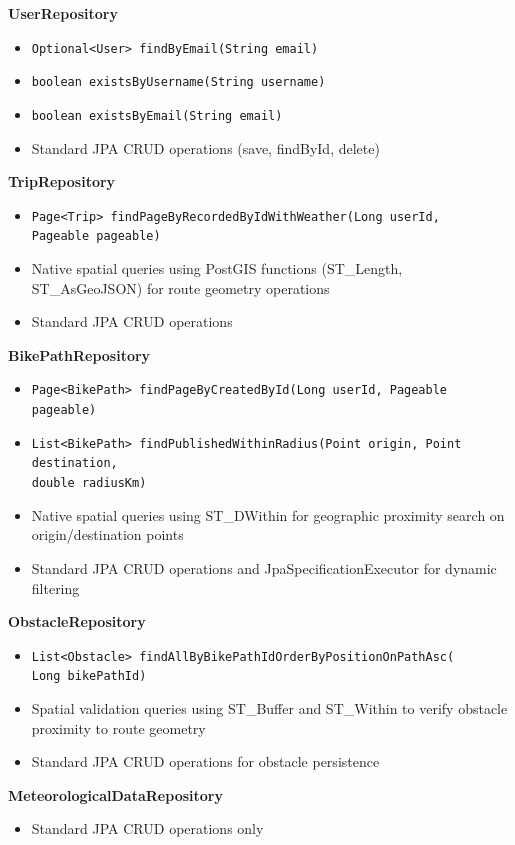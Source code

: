 \textbf{UserRepository}
\begin{itemize}
    \item \texttt{Optional<User> findByEmail(String email)}
    \item \texttt{boolean existsByUsername(String username)}
    \item \texttt{boolean existsByEmail(String email)}
    \item Standard JPA CRUD operations (save, findById, delete)
\end{itemize}

\textbf{TripRepository}
\begin{itemize}
    \item \texttt{Page<Trip> findPageByRecordedByIdWithWeather(Long userId, \\ Pageable pageable)}
    \item Native spatial queries using PostGIS functions (ST\_Length, ST\_AsGeoJSON) for route geometry operations
    \item Standard JPA CRUD operations
\end{itemize}

\textbf{BikePathRepository}
\begin{itemize}
    \item \texttt{Page<BikePath> findPageByCreatedById(Long userId, Pageable pageable)}
    \item \texttt{List<BikePath> findPublishedWithinRadius(Point origin, Point destination, \\ double radiusKm)}
    \item Native spatial queries using ST\_DWithin for geographic proximity search on origin/destination points
    \item Standard JPA CRUD operations and JpaSpecificationExecutor for dynamic filtering
\end{itemize}

\textbf{ObstacleRepository}
\begin{itemize}
    \item \texttt{List<Obstacle> findAllByBikePathIdOrderByPositionOnPathAsc( \\ Long bikePathId)}
    \item Spatial validation queries using ST\_Buffer and ST\_Within to verify obstacle proximity to route geometry
    \item Standard JPA CRUD operations for obstacle persistence
\end{itemize}

\textbf{MeteorologicalDataRepository}
\begin{itemize}
    \item Standard JPA CRUD operations only
\end{itemize}

